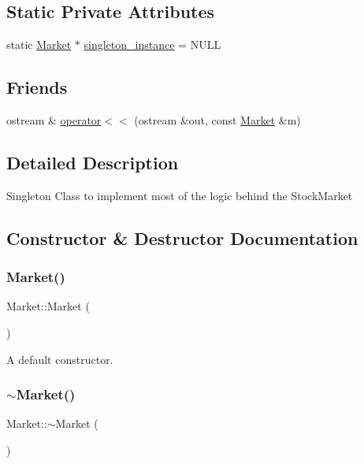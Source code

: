 \subsection*{Static Private Attributes}
\begin{DoxyCompactItemize}
\item 
static \hyperlink{class_market}{Market} $\ast$ \hyperlink{class_market_aefa75303e9c16ffd77f18fee3caa6e20}{singleton\+\_\+instance} = N\+U\+LL
\end{DoxyCompactItemize}
\subsection*{Friends}
\begin{DoxyCompactItemize}
\item 
ostream \& \hyperlink{class_market_a7011d607c3f984135fbc081b8909a1d6}{operator$<$$<$} (ostream \&out, const \hyperlink{class_market}{Market} \&m)
\end{DoxyCompactItemize}


\subsection{Detailed Description}
Singleton Class to implement most of the logic behind the Stock\+Market 

\subsection{Constructor \& Destructor Documentation}
\mbox{\label{class_market_aceddb4e7d1f53bc1e3a4f10b2254437f}} 
\subsubsection{\texorpdfstring{Market()}{Market()}}
{\footnotesize\ttfamily Market\+::\+Market (\begin{DoxyParamCaption}{ }\end{DoxyParamCaption})\hspace{0.3cm}{\ttfamily [private]}}

A default constructor. \mbox{\label{class_market_affb37a82b0eb904290c6dbbf6736524c}} 
\subsubsection{\texorpdfstring{$\sim$\+Market()}{~Market()}}
{\footnotesize\ttfamily Market\+::$\sim$\+Market (\begin{DoxyParamCaption}{ }\end{DoxyParamCaption})\hspace{0.3cm}{\ttfamily [private]}}

